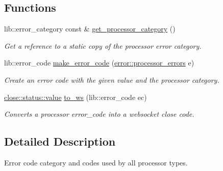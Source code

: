 \subsection*{Functions}
\begin{DoxyCompactItemize}
\item 
\mbox{\label{namespacewebsocketpp_1_1processor_1_1error_ae06f6461fb27d8c8e0358c413e1d32b4}} 
lib\+::error\+\_\+category const  \& \mbox{\hyperlink{namespacewebsocketpp_1_1processor_1_1error_ae06f6461fb27d8c8e0358c413e1d32b4}{get\+\_\+processor\+\_\+category}} ()
\begin{DoxyCompactList}\small\item\em Get a reference to a static copy of the processor error category. \end{DoxyCompactList}\item 
\mbox{\label{namespacewebsocketpp_1_1processor_1_1error_afc5fc4548656f87cfee89994c95bec9c}} 
lib\+::error\+\_\+code \mbox{\hyperlink{namespacewebsocketpp_1_1processor_1_1error_afc5fc4548656f87cfee89994c95bec9c}{make\+\_\+error\+\_\+code}} (\mbox{\hyperlink{namespacewebsocketpp_1_1processor_1_1error_ae6510ada6a25dcd7af258b6e374e3ca5}{error\+::processor\+\_\+errors}} e)
\begin{DoxyCompactList}\small\item\em Create an error code with the given value and the processor category. \end{DoxyCompactList}\item 
\mbox{\hyperlink{namespacewebsocketpp_1_1close_1_1status_a8614a5c4733d708e2d2a32191c5bef84}{close\+::status\+::value}} \mbox{\hyperlink{namespacewebsocketpp_1_1processor_1_1error_a30c8a38f28c65b3398f88ad989186111}{to\+\_\+ws}} (lib\+::error\+\_\+code ec)
\begin{DoxyCompactList}\small\item\em Converts a processor error\+\_\+code into a websocket close code. \end{DoxyCompactList}\end{DoxyCompactItemize}


\subsection{Detailed Description}
Error code category and codes used by all processor types. 

